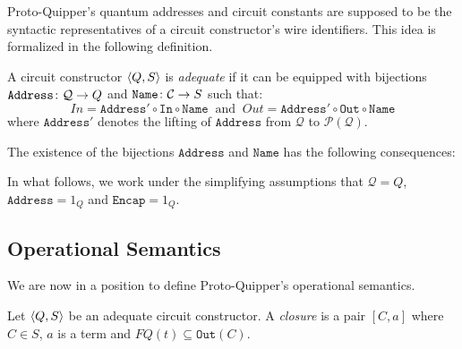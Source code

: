 \documentclass{article}
\begin{document}
Proto-Quipper's quantum addresses and circuit constants are supposed 
to be the syntactic representatives of a circuit constructor's wire 
identifiers. This idea is formalized in the following definition.

\begin{definition}
A circuit constructor $\langle Q,S\rangle$ is \emph{adequate} if it can 
be equipped with bijections $\mathtt{Address}\colon \mathcal{Q} \to Q$ 
and $\mathtt{Name}\colon \mathcal{C} \to S$ such that:
\[In=\mathtt{Address}' \circ\mathtt{In}\circ \mathtt{Name} 
~\mbox{ and }~ 
Out=\mathtt{Address}'\circ\mathtt{Out}\circ \mathtt{Name}
\]
where $\mathtt{Address}'$ denotes the lifting of $\mathtt{Address}$ 
from $\mathcal{Q}$ to $\mathcal{P}(\mathcal{Q})$.
\end{definition}

\begin{remark}
\label{structure-transfer}
The existence of the bijections $\mathtt{Address}$ and $\mathtt{Name}$ has 
the following consequences:

In what follows, we work under the simplifying assumptions that $\mathcal{Q}=Q$, 
$\mathtt{Address}=1_Q$ and $\mathtt{Encap}=1_Q$.
\end{remark}


\subsection{Operational Semantics}

We are now in a position to define Proto-Quipper's operational 
semantics.

\begin{definition}
Let $\langle Q,S\rangle$ be an adequate circuit constructor. A 
\emph{closure} is a pair $[C,a]$ where $C\in S$, $a$ is a 
term and $FQ(t)\subseteq\mathtt{Out}(C)$. 
\end{definition}
\end{document}
